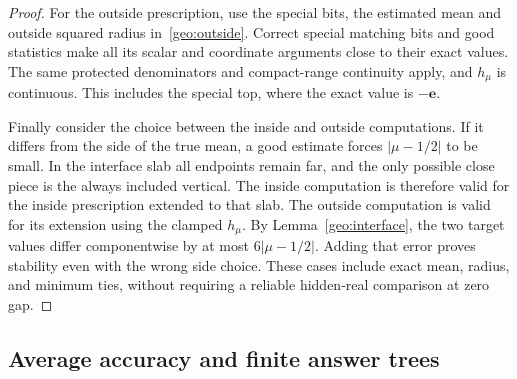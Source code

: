 \begin{proof}
For the outside prescription, use the special bits, the estimated mean
and outside squared radius in~\eqref{geo:outside}. Correct special
matching bits and good statistics make all its scalar and coordinate
arguments close to their exact values. The same protected denominators
and compact-range continuity apply, and $h_\mu$ is continuous. This
includes the special top, where the exact value is $-\mathbf e$.

Finally consider the choice between the inside and outside computations.
If it differs from the side of the true mean, a good
estimate forces $|\mu-1/2|$ to be small. In the interface slab all
endpoints remain far, and the only possible close piece is the always
included vertical. The inside computation is therefore valid for the
inside prescription extended to that slab. The outside computation is
valid for its extension using the clamped $h_\mu$. By
Lemma~\ref{geo:interface}, the two target values differ componentwise
by at most $6|\mu-1/2|$. Adding that error proves stability even with
the wrong side choice. These cases include exact mean, radius, and
minimum ties, without requiring a reliable hidden-real comparison at
zero gap.
\end{proof}

\subsection{Average accuracy and finite answer trees}
\label{geo:finite-schema}

